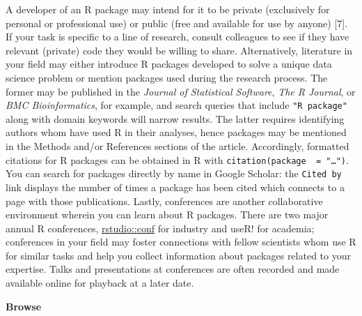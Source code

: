 \documentclass[10pt,letterpaper]{article}
\begin{document}
A developer of an R package may intend for it to be private (exclusively
for personal or professional use) or public (free and available for use
by anyone) {[}7{]}. If your task is specific to a line of research,
consult colleagues to see if they have relevant (private) code they
would be willing to share. Alternatively, literature in your field may
either introduce R packages developed to solve a unique data science
problem or mention packages used during the research process. The former
may be published in the \emph{Journal of Statistical Software},
\emph{The R Journal}, or \emph{BMC Bioinformatics}, for example, and
search queries that include \texttt{"R\ package"} along with domain
keywords will narrow results. The latter requires identifying authors
whom have used R in their analyses, hence packages may be mentioned in
the Methods and/or References sections of the article. Accordingly,
formatted citations for R packages can be obtained in R with
\texttt{citation(package\ \ =\ "\ldots{}")}. You can search for packages
directly by name in Google Scholar: the \texttt{Cited\ by} link displays
the number of times a package has been cited which connects to a page
with those publications. Lastly, conferences are another collaborative
environment wherein you can learn about R packages. There are two major
annual R conferences,
\href{https://rstudio.com/conference/}{rstudio::conf} for industry and
useR! for academia; conferences in your field may foster connections
with fellow scientists whom use R for similar tasks and help you collect
information about packages related to your expertise. Talks and
presentations at conferences are often recorded and made available
online for playback at a later date.

\textbf{Browse}
\end{document}
